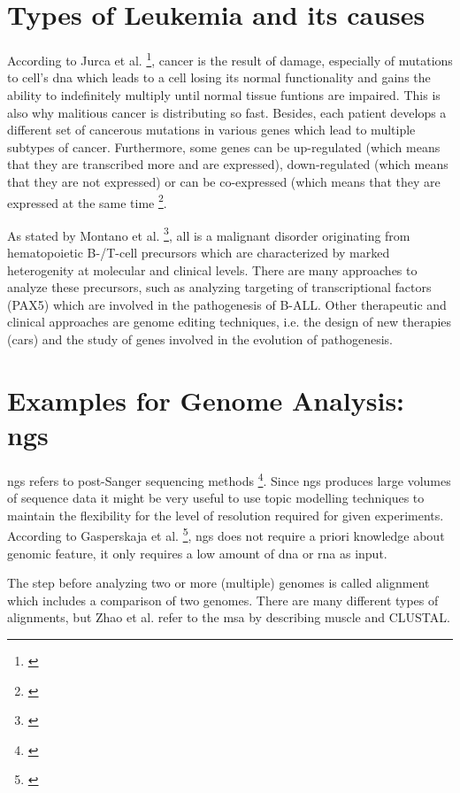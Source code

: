 \section{Types of Leukemia and its causes}\label{leukemia_types}
According to Jurca et al. \footnote{\autocite{jurca_2016}}, cancer is the result of damage, especially of mutations to cell's \gls{dna} which leads to a cell losing its normal functionality and gains the ability to indefinitely multiply until normal tissue funtions are impaired. This is also why malitious cancer is distributing so fast. Besides, each patient develops a different set of cancerous mutations in various genes which lead to multiple subtypes of cancer.
Furthermore, some genes can be up-regulated (which means that they are transcribed more and are expressed), down-regulated (which means that they are not expressed) or can be co-expressed (which means that they are expressed at the same time \footnote{\autocite{jurca_2016}}.

As stated by Montano et al. \footnote{\autocite{montano_2018}}, \gls{all} is a malignant disorder originating from hematopoietic B-/T-cell precursors which are characterized by marked heterogenity at molecular and clinical levels. There are many approaches to analyze these precursors, such as analyzing targeting of transcriptional factors (PAX5) which are involved in the pathogenesis of B-ALL. Other therapeutic and clinical approaches are genome editing techniques, i.e. the design of new therapies (\gls{car}s) and the study of genes involved in the evolution of pathogenesis.

\section{Examples for Genome Analysis: \gls{ngs}}\label{genome_analysis}
\gls{ngs} refers to post-Sanger sequencing methods \footnote{\autocite{zhao_2016}}. Since \gls{ngs} produces large volumes of sequence data it might be very useful to use topic modelling techniques to maintain the flexibility for the level of resolution required for given experiments.  
According to Gasperskaja et al. \footnote{\autocite{gasperskaja_2017}}, \gls{ngs} does not require a priori knowledge about genomic feature, it only requires a low amount of \gls{dna} or \gls{rna} as input.

The step before analyzing two or more (multiple) genomes is called alignment which includes a comparison of two genomes. There are many different types of alignments, but Zhao et al. refer to the \gls{msa} by describing \gls{muscle} and CLUSTAL.

